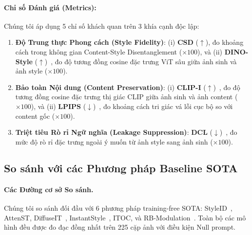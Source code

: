 \documentclass[runningheads]{llncs}
\begin{document}
\paragraph{Chỉ số Đánh giá (Metrics):}
Chúng tôi áp dụng 5 chỉ số khách quan trên 3 khía cạnh độc lập:
\begin{enumerate}
    \item \textbf{Độ Trung thực Phong cách (Style Fidelity)}: (i) \textbf{CSD} ($\uparrow$), đo khoảng cách trong không gian Content-Style Disentanglement ($\times 100$), và (ii) \textbf{DINO-Style} ($\uparrow$)~\cite{dino}, đo độ tương đồng cosine đặc trưng ViT sâu giữa ảnh sinh và ảnh style ($\times 100$).
    \item \textbf{Bảo toàn Nội dung (Content Preservation)}: (i) \textbf{CLIP-I} ($\uparrow$)~\cite{clip}, đo độ tương đồng cosine đặc trưng thị giác CLIP giữa ảnh sinh và ảnh content ($\times 100$), và (ii) \textbf{LPIPS} ($\downarrow$)~\cite{lpips}, đo khoảng cách tri giác vá lỗi cục bộ so với content gốc ($\times 100$).
    \item \textbf{Triệt tiêu Rò rỉ Ngữ nghĩa (Leakage Suppression)}: \textbf{DCL} ($\downarrow$)~\cite{rout2025rbmodulation}, đo mức độ rò rỉ đặc trưng ngoài ý muốn từ ảnh style sang ảnh sinh ($\times 100$).
\end{enumerate}

\subsection{So sánh với các Phương pháp Baseline SOTA}

\paragraph{Các Đường cơ sở So sánh.}
Chúng tôi so sánh đối đầu với 6 phương pháp training-free SOTA: StyleID~\cite{styleid}, AttenST, DiffuseIT~\cite{diffuseIT}, InstantStyle~\cite{instantstyle}, ITOC, và RB-Modulation~\cite{rout2025rbmodulation}. Toàn bộ các mô hình đều được đo đạc đồng nhất trên 225 cặp ảnh với điều kiện Null prompt.
\end{document}
